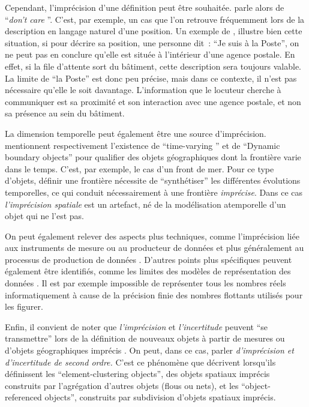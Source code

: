 Cependant, l’imprécision d’une définition peut être souhaitée.
\textcite{Hadzilacos1996} parle alors de
\foreignquote{english}{\emph{don't care }}. C’est,
par exemple, un cas que l’on retrouve fréquemment lors de la
description en langage naturel d’une position. Un exemple de
\textcite{Bateman2010}, illustre bien cette situation, si pour décrire
sa position, une personne dit : \enquote{Je suis à la Poste}, on ne
peut pas en conclure qu’elle est située à l’intérieur d’une agence
postale. En effet, si la file d’attente sort du bâtiment, cette
description sera toujours valable. La limite de \enquote{la Poste} est
donc peu précise, mais dans ce contexte, il n’est pas nécessaire
qu’elle le soit davantage. L’information que le locuteur cherche à
communiquer est sa proximité et son interaction avec une agence
postale, et non sa présence au sein du bâtiment.

La dimension temporelle peut également être une source
d’imprécision. \textcite{Hadzilacos1996,Liu2019} mentionnent
respectivement l’existence de \enquote{time-varying
  } et de \enquote{Dynamic boundary objects} pour
qualifier des objets géographiques dont la frontière varie dans le
temps. C’est, par exemple, le cas d’un front de mer. Pour ce type
d’objets, définir une frontière nécessite de \enquote{synthétiser} les
différentes évolutions temporelles, ce qui conduit nécessairement à
une frontière \emph{imprécise}. Dans ce cas \emph{l’imprécision
  spatiale} est un artefact, né de la modélisation atemporelle d’un
objet qui ne l’est pas.

On peut également relever des aspects plus techniques, comme
l’imprécision liée aux instruments de mesure ou au producteur de
données \autocite{Follin2019} et plus généralement au processus de
production de données
\autocite{Dutton1992,Evans2008,Follin2019}. D’autres points plus
spécifiques peuvent également être identifiés, comme les limites des
modèles de représentation des données
\autocite{Dutton1992,Follin2019}. Il est par exemple impossible de
représenter tous les nombres réels informatiquement à cause de la
précision finie des nombres flottants utilisés pour les figurer.

Enfin, il convient de noter que \emph{l’imprécision} et
\emph{l’incertitude} peuvent \enquote{se transmettre} lors de la
définition de nouveaux objets à partir de mesures
\autocite{Dutton1992} ou d’objets géographiques imprécis
\autocite{Liu2019,Follin2019}. On peut, dans ce cas, parler
\emph{d’imprécision \emph{et} d’incertitude de second ordre.} C’est ce
phénomène que décrivent \textcite{Liu2019} lorsqu’ils définissent les
\enquote{element-clustering objects}, des objets spatiaux imprécis
construits par l’agrégation d’autres objets (flous ou nets), et les
\enquote{object-referenced objects}, construits par subdivision
d’objets spatiaux imprécis.

